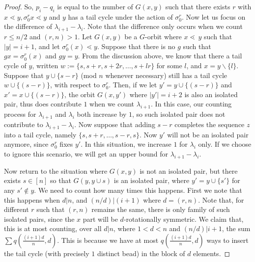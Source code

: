 \documentclass[10 pt]{amsart}
\theoremstyle{plain}
\theoremstyle{definition}
\theoremstyle{remark}
\numberwithin{equation}{section}
\newcommand{\minus}{\backslash}
\newcommand{\dstyle}{\displaystyle}
\begin{document}
\begin{proof}
So, $p_i - q_i$ is equal to the number of $G(x, y)$ such that there exists $r$ with $x\lessdot y,\sigma_0^r x \lessdot y$ and $y$ has a tail cycle under the action of $\sigma_0^r$. Now let us focus on the difference of $\lambda_{i+1} - \lambda_{i}$.  Note that the difference only occurs when we count $r \le n/2$ and $(r, n) > 1$. Let $G{(x , y)}$ be a $G$-orbit where $x \lessdot \, y$ such that $|y| = i+1$, and let $\sigma_0^{r} (x) \lessdot  y.$ Suppose that there is no $g$ such that $g x = \sigma_0 ^r (x)$ and $gy = y$. From the discussion above, we know that there a tail cycle of $y$, written $w := \{s,s+r,s+2r,\ldots,s+lr\}$  for some $l $, and $x = y \minus \{l\} $. Suppose that $y \cup \{s-r\}$ (mod $n$ whenever necessary) still has a tail cycle $w \cup \{(s - r)\}$, with respect to $\sigma_0^r.$ Then, if we let  $y' = y \cup \{(s - r) \} $ and $x' = x \cup \{(s -r)\}$, the orbit $G{(x, y')}$ where $|y'| = i+2$ is also an isolated pair, thus does contribute $1$ when we count $\lambda_{i+1}$.  In this case, our counting process for $\lambda_{i+1}$ and $\lambda_{i}$ both increase by $1$, so such isolated pair does not contribute to $\lambda_{i+1} - \lambda_{i}$.  Now suppose that adding $s -r$ completes the sequence $z$ into a tail cycle, namely $\{s,s+r,\ldots,s-r, s\}$. Now $y'$ will not be an isolated pair anymore, since $\sigma_0^r $ fixes $y'$. In this situation,  we increase  $1$ for $\lambda_i$ only.  If we choose to ignore this scenario, we will get an upper bound for $\lambda_{i+1} - \lambda_i$. 

Now return to the situation where $G{(x , y)}$ is not an isolated pair, but there exists $s \in [n]$ so that $G{(y , y \cup s)}$ is an isolated pair, where $y' = y \cup \{s'\}$ for any $s' \notin y$. We need to count how many times this happens.  First we note that this happens when $d | n$, and $(n/d) | (i+1)$ where $d = (r, n)$. Note that, for different $r$ such that $(r, n)$ remains the same, there is only family of such isolated pairs, since the $x$ part will be $d$-rotationally symmetric.  We claim that, this  is at most counting,  over all $d | n$, where $1 < d < n$ and $(n/d) | i+1 $, the sum $\dstyle \sum q \left(\frac{(i+1)d}{n}, d\right)$.  This is because we have at most $q(\frac{(i+1)d}{n}, d)$ ways to insert the tail cycle (with precisely $1$ distinct bead) in the block of $d$ elements. 


\end{proof}
\end{document}
